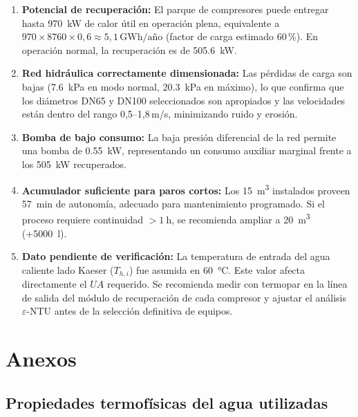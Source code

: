 \documentclass[11pt,a4paper]{article}
\begin{document}
\begin{enumerate}
  \item \textbf{Potencial de recuperación:} El parque de compresores puede entregar hasta
    \SI{970}{\kilo\watt} de calor útil en operación plena, equivalente a
    $970 \times 8760 \times 0{,}6 \approx 5{,}1\,\text{GWh/año}$
    (factor de carga estimado 60\,\%). En operación normal, la recuperación es de
    \SI{505.6}{\kilo\watt}.

  \item \textbf{Red hidráulica correctamente dimensionada:} Las pérdidas de carga son
    bajas (\SI{7.6}{\kilo\pascal} en modo normal, \SI{20.3}{\kilo\pascal} en máximo),
    lo que confirma que los diámetros DN65 y DN100 seleccionados son apropiados y las
    velocidades están dentro del rango 0{,}5–1{,}8\,m/s, minimizando ruido y erosión.

  \item \textbf{Bomba de bajo consumo:} La baja presión diferencial de la red permite
    una bomba de \SI{0.55}{\kilo\watt}, representando un consumo auxiliar marginal
    frente a los \SI{505}{\kilo\watt} recuperados.

  \item \textbf{Acumulador suficiente para paros cortos:} Los \SI{15}{\cubic\metre}
    instalados proveen \SI{57}{\minute} de autonomía, adecuado para mantenimiento
    programado. Si el proceso requiere continuidad $>\SI{1}{\hour}$, se recomienda
    ampliar a \SI{20}{\cubic\metre} (+\SI{5000}{\litre}).

  \item \textbf{Dato pendiente de verificación:} La temperatura de entrada del agua
    caliente lado Kaeser ($T_{h,i}$) fue asumida en \SI{60}{\celsius}. Este valor
    afecta directamente el $UA$ requerido. Se recomienda medir con termopar en la
    línea de salida del módulo de recuperación de cada compresor y ajustar el análisis
    $\varepsilon$-NTU antes de la selección definitiva de equipos.
\end{enumerate}


\section{Anexos}

\subsection{Propiedades termofísicas del agua utilizadas}
\end{document}
